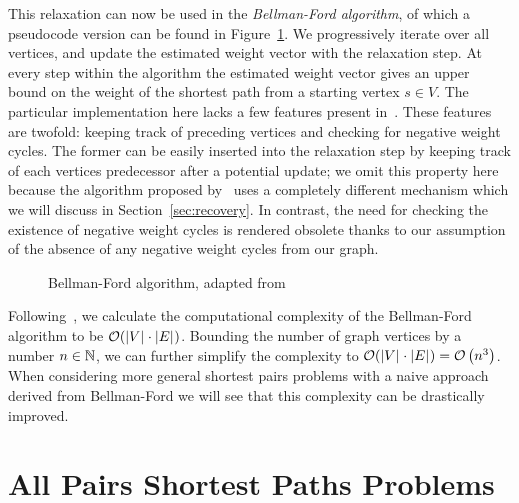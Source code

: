 This relaxation can now be used in the \emph{Bellman-Ford algorithm}, of which a pseudocode version can be found in Figure~\ref{alg:bellman-ford}.
We progressively iterate over all vertices, and update the estimated weight vector with the relaxation step.
At every step within the algorithm the estimated weight vector gives an upper bound on the weight of the shortest path from a starting vertex $s \in V$.
The particular implementation here lacks a few features present in~\cite{Cormen2001}.
These features are twofold: keeping track of preceding vertices and checking for negative weight cycles.
The former can be easily inserted into the relaxation step by keeping track of each vertices predecessor after a potential update; we omit this property here because the algorithm proposed by~\cite{Chan2007} uses a completely different mechanism which we will discuss in Section~\ref{sec:recovery}.
In contrast, the need for checking the existence of negative weight cycles is rendered obsolete thanks to our assumption of the absence of any negative weight cycles from our graph.

\begin{figure}[ht]
    \centering
    \begin{minipage}{.4\textwidth}
        \begin{algorithm}[H]
        \end{algorithm}
    \end{minipage}
    \caption{Bellman-Ford algorithm, adapted from~\cite[Section~24.1]{Cormen2001}\label{alg:bellman-ford}}
\end{figure}

Following~\cite{Cormen2001}, we calculate the computational complexity of the Bellman-Ford algorithm to be $\mathcal{O}(\left\lvert V\right\rvert_{} \cdot \left\lvert E\right\rvert_{})$.
Bounding the number of graph vertices by a number $n \in \mathbb{N}$, we can further simplify the complexity to $\mathcal{O}(\left\lvert V\right\rvert_{} \cdot \left\lvert E\right\rvert_{}) = \mathcal{O}\left( n^3 \right)$.
When considering more general shortest pairs problems with a naive approach derived from Bellman-Ford we will see that this complexity can be drastically improved.

\section{All Pairs Shortest Paths Problems}\label{sec:apspps}

